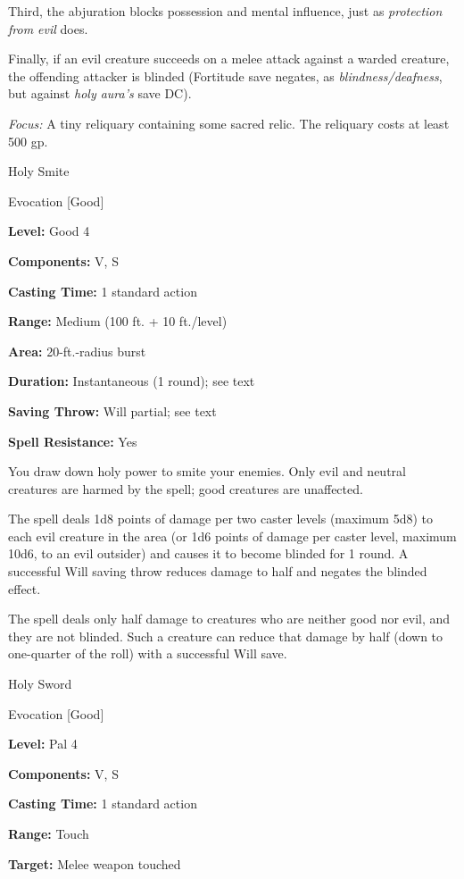 \documentclass{article}
\begin{document}
Third, the abjuration blocks possession and mental influence, just as \textit{protection 
from evil }does.

Finally, if an evil creature succeeds on a melee attack against a warded creature, 
the offending attacker is blinded (Fortitude save negates, as \textit{blindness/deafness}, 
but against \textit{holy aura's }save DC).

\textit{Focus: }A tiny reliquary containing some sacred relic. The reliquary costs 
at least 500 gp.

\vspace{12pt}
Holy Smite

Evocation [Good]

\textbf{Level:} Good 4

\textbf{Components:} V, S

\textbf{Casting Time:} 1 standard action

\textbf{Range: }Medium (100 ft. + 10 ft./level)

\textbf{Area:} 20-ft.-radius burst

\textbf{Duration:} Instantaneous (1 round); see text

\textbf{Saving Throw: }Will partial; see text

\textbf{Spell Resistance:} Yes

You draw down holy power to smite your enemies. Only evil and neutral creatures 
are harmed by the spell; good creatures are unaffected.

The spell deals 1d8 points of damage per two caster levels (maximum 5d8) to each 
evil creature in the area (or 1d6 points of damage per caster level, maximum 10d6, 
to an evil outsider) and causes it to become blinded for 1 round. A successful 
Will saving throw reduces damage to half and negates the blinded effect.

The spell deals only half damage to creatures who are neither good nor evil, and 
they are not blinded. Such a creature can reduce that damage by half (down to one-quarter 
of the roll) with a successful Will save.

\vspace{12pt}
Holy Sword

Evocation [Good]

\textbf{Level:} Pal 4

\textbf{Components:} V, S

\textbf{Casting Time:} 1 standard action

\textbf{Range:} Touch

\textbf{Target: }Melee weapon touched
\end{document}
